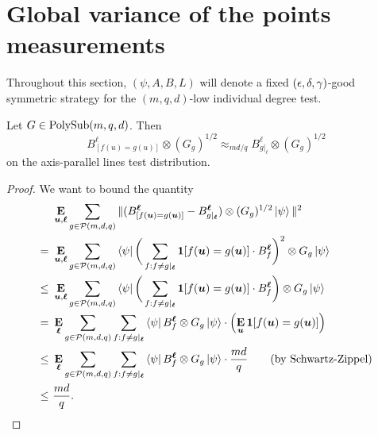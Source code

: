 \section{Global variance of the points measurements}
\label{sec:variance}
Throughout this section, $(\psi, A, B, L)$ will denote a fixed $(\epsilon, \delta, \gamma)$-good symmetric strategy for the $(m,q,d)$-low individual degree test.

\begin{lemma}\label{lem:generalize-b}
Let $G \in \mathrm{PolySub}(m, q, d)$. Then
\begin{equation*}
B^\ell_{[f(u) = g(u)]} \otimes (G_g)^{1/2} \approx_{md/q} B^\ell_{g|_\ell} \otimes (G_g)^{1/2}
\end{equation*}
on the axis-parallel lines test distribution.
\end{lemma}
\begin{proof}
We want to bound the quantity
\begin{align*}
&~\mathop{\bf E\/}_{\boldsymbol{u}, \boldsymbol{\ell}} \sum_{g \in \mathcal{P}(m, d, q)} \Vert (B^{\boldsymbol{\ell}}_{[f(\boldsymbol{u}) = g(\boldsymbol{u})]}  - B^{\boldsymbol{\ell}}_{g|_{\boldsymbol{\ell}}}) \otimes (G_g)^{1/2} \ket{\psi}\Vert^2\\
=&~\mathop{\bf E\/}_{\boldsymbol{u}, \boldsymbol{\ell}} \sum_{g \in \mathcal{P}(m, d, q)} \bra{\psi} \bigg(\sum_{f : f \neq g|_{\boldsymbol{\ell}}} \boldsymbol{1}[f(\boldsymbol{u}) = g(\boldsymbol{u})] \cdot B^{\boldsymbol{\ell}}_f\bigg)^2 \otimes G_g \ket{\psi}\\
\leq&~\mathop{\bf E\/}_{\boldsymbol{u}, \boldsymbol{\ell}} \sum_{g \in \mathcal{P}(m, d, q)} \bra{\psi} \bigg(\sum_{f : f \neq g|_{\boldsymbol{\ell}}} \boldsymbol{1}[f(\boldsymbol{u}) = g(\boldsymbol{u})] \cdot B^{\boldsymbol{\ell}}_f\bigg) \otimes G_g \ket{\psi} \\
= &~\mathop{\bf E\/}_{\boldsymbol{\ell}} \sum_{g \in \mathcal{P}(m, d, q)} \sum_{f : f \neq g|_{\boldsymbol{\ell}}} \bra{\psi}  B^{\boldsymbol{\ell}}_f \otimes G_g \ket{\psi} \cdot \left( \mathop{\bf E\/}_{\boldsymbol{u}} \boldsymbol{1}[f(\boldsymbol{u}) = g(\boldsymbol{u})]\right)\\
\leq &~\mathop{\bf E\/}_{\boldsymbol{\ell}} \sum_{g \in \mathcal{P}(m, d, q)} \sum_{f : f \neq g|_{\boldsymbol{\ell}}} \bra{\psi}  B^{\boldsymbol{\ell}}_f \otimes G_g \ket{\psi} \cdot \frac{md}{q}\tag{by Schwartz-Zippel}\\
\leq &~\frac{md}{q}.\qedhere
\end{align*}
\end{proof}

